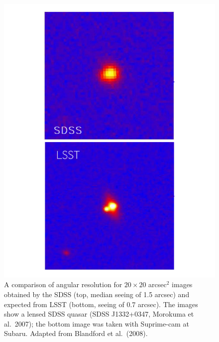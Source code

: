 \documentclass{emulateapj}
\begin{document}
\begin{figure}
\includegraphics[width=1.0\hsize,clip]{panels2.pdf}
\caption{A comparison of angular resolution for $20\times20$ arcsec$^2$ images obtained 
by the SDSS (top, median seeing of 1.5 arcsec) and expected from LSST (bottom,
seeing of 0.7 arcsec). The images show a lensed SDSS quasar (SDSS J1332+0347,
Morokuma et al.~2007); the bottom image was taken with Suprime-cam at Subaru. 
Adapted from Blandford et al.~(2008).} 
\label{Fig:panels2}
\end{figure}
\end{document}
